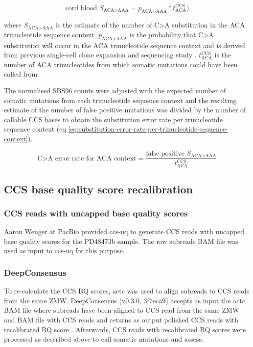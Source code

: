 \begin{equation} \label{eq:mutation-count-estimation}
\text{cord blood } S_{\text{ACA>AAA}}= p_{\text{ACA>AAA}} * t^{\text{CCS}}_{\text{ACA}})
\end{equation}

where $S_{\text{ACA>AAA}}$ is the estimate of the number of C>A substitution in the ACA trinucleotide sequence context. $p_{\text{ACA>AAA}}$ is the probability that C>A substitution will occur in the ACA trinucleotide sequence context and is derived from previous single-cell clone expansion and sequencing study \cite{Mitchell2022-ry}. $t^{\text{CCS}}_{\text{ACA}}$ is the number of ACA trinucleotides from which somatic mutations could have been called from.

The normalised SBS96 counts were adjusted with the expected number of somatic mutations from each trinucleotide sequence context and the resulting estimate of the number of false positive mutations was divided by the number of callable CCS bases to obtain the substitution error rate per trinucleotide sequence context (eq \ref{eq:substitution-error-rate-per-trinucleotide-sequence-context}). 

\begin{equation} \label{eq:substitution-error-rate-per-trinucleotide-sequence-context}
\text{C>A error rate for ACA context} = \frac{\text{false positive } S_{\text{ACA>AAA}}}{t^{\text{CCS}}_{\text{ACA}}}
\end{equation}

\subsection{CCS base quality score recalibration}

\subsubsection{CCS reads with uncapped base quality scores}
 
Aaron Wenger at PacBio provided ccs-uq to generate CCS reads with uncapped base quality scores for the PD48473b sample. The raw subreads BAM file was used as input to ccs-uq for this purpose.

\subsubsection{DeepConsensus}
To re-calculate the CCS BQ scores, actc \cite{actc} was used to align subreads to CCS reads from the same ZMW. DeepConsensus (v0.3.0, 3f7eca9) accepts as input the actc BAM file where subreads have been aligned to CCS read from the same ZMW and BAM file with CCS reads and returns as output polished CCS reads with recalibrated BQ score \cite{Baid2022-or}. Afterwards, CCS reads with recalibrated BQ scores were processed as described above to call somatic mutations and assess. 




